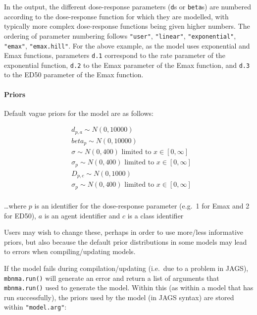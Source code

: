\documentclass[]{article}
\newenvironment{Shaded}{\begin{snugshade}}{\end{snugshade}}
\newcommand{\CommentTok}[1]{\textcolor[rgb]{0.56,0.35,0.01}{\textit{#1}}}
\newcommand{\KeywordTok}[1]{\textcolor[rgb]{0.13,0.29,0.53}{\textbf{#1}}}
\newcommand{\NormalTok}[1]{#1}
\newcommand{\OperatorTok}[1]{\textcolor[rgb]{0.81,0.36,0.00}{\textbf{#1}}}
\let\oldparagraph\paragraph
\renewcommand{\paragraph}[1]{\oldparagraph{#1}\mbox{}}
\begin{document}
In the output, the different dose-response parameters (\texttt{d}s or
\texttt{beta}s) are numbered according to the dose-response function for
which they are modelled, with typically more complex dose-response
functions being given higher numbers. The ordering of parameter
numbering follows \texttt{"user"}, \texttt{"linear"},
\texttt{"exponential"}, \texttt{"emax"}, \texttt{"emax.hill"}. For the
above example, as the model uses exponential and Emax functions,
parameters \texttt{d.1} correspond to the rate parameter of the
exponential function, \texttt{d.2} to the Emax parameter of the Emax
function, and \texttt{d.3} to the ED50 parameter of the Emax function.

\hypertarget{priors}{%
\paragraph{Priors}\label{priors}}

Default vague priors for the model are as follows:

\[
\begin{aligned}
  &d_{p,a} \sim N(0,10000)\\
  &beta_{p} \sim N(0,10000)\\
  &\sigma \sim N(0,400) \text{  limited to  } x \in [0,\infty]\\
  &\sigma_{p} \sim N(0,400) \text{  limited to  } x \in [0,\infty]\\
  &D_{p,c} \sim N(0,1000)\\
  &\sigma_{p} \sim N(0,400) \text{ limited to } x \in [0,\infty]\\
\end{aligned}
\]

\ldots where \(p\) is an identifier for the dose-response parameter
(e.g.~1 for Emax and 2 for ED50), \(a\) is an agent identifier and \(c\)
is a class identifier

Users may wish to change these, perhaps in order to use more/less
informative priors, but also because the default prior distributions in
some models may lead to errors when compiling/updating models.

If the model fails during compilation/updating (i.e.~due to a problem in
JAGS), \texttt{mbnma.run()} will generate an error and return a list of
arguments that \texttt{mbnma.run()} used to generate the model. Within
this (as within a model that has run successfully), the priors used by
the model (in JAGS syntax) are stored within \texttt{"model.arg"}:

\begin{Shaded}
\end{Shaded}
\end{document}
